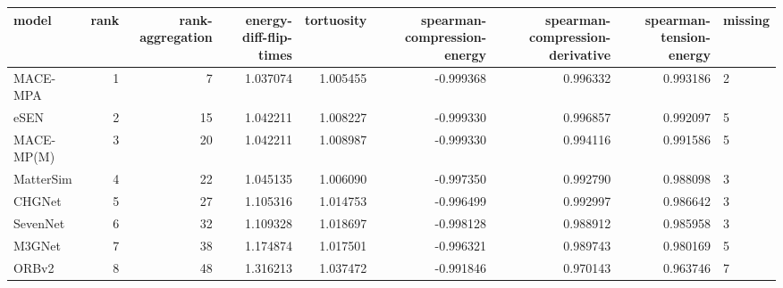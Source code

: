 \begin{tabular}{lrrrrrrrl}
\toprule
model & rank & rank-aggregation & energy-diff-flip-times & tortuosity & spearman-compression-energy & spearman-compression-derivative & spearman-tension-energy & missing \\
\midrule
MACE-MPA & 1 & 7 & 1.037074 & 1.005455 & -0.999368 & 0.996332 & 0.993186 & 2 \\
eSEN & 2 & 15 & 1.042211 & 1.008227 & -0.999330 & 0.996857 & 0.992097 & 5 \\
MACE-MP(M) & 3 & 20 & 1.042211 & 1.008987 & -0.999330 & 0.994116 & 0.991586 & 5 \\
MatterSim & 4 & 22 & 1.045135 & 1.006090 & -0.997350 & 0.992790 & 0.988098 & 3 \\
CHGNet & 5 & 27 & 1.105316 & 1.014753 & -0.996499 & 0.992997 & 0.986642 & 3 \\
SevenNet & 6 & 32 & 1.109328 & 1.018697 & -0.998128 & 0.988912 & 0.985958 & 3 \\
M3GNet & 7 & 38 & 1.174874 & 1.017501 & -0.996321 & 0.989743 & 0.980169 & 5 \\
ORBv2 & 8 & 48 & 1.316213 & 1.037472 & -0.991846 & 0.970143 & 0.963746 & 7 \\
\bottomrule
\end{tabular}
